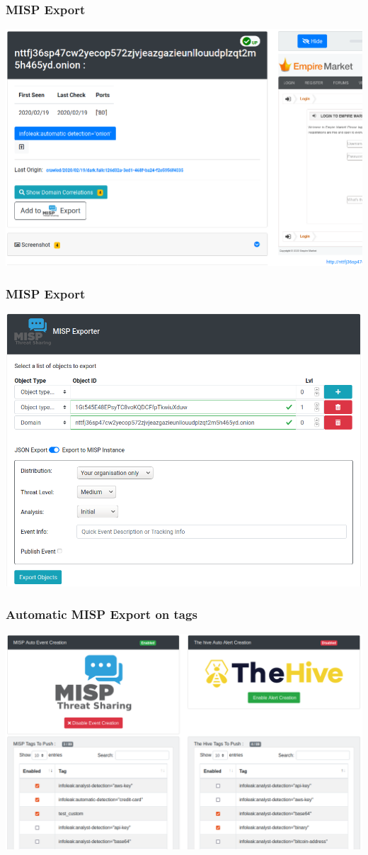 \documentclass[aspectratio=169]{beamer}
\begin{document}
\begin{frame}
    \frametitle{MISP Export}
    \centerline{\includegraphics[scale=0.35]{screenshot/domain-misp.png}}
\end{frame}

\begin{frame}
    \frametitle{MISP Export}
    \centerline{\includegraphics[scale=0.25]{screenshot/misp-export.png}}
\end{frame}

\begin{frame}
    \frametitle{Automatic MISP Export on tags}
    \centerline{\includegraphics[scale=0.25]{screenshot/tags_misp_auto.png}}
\end{frame}
\end{document}
